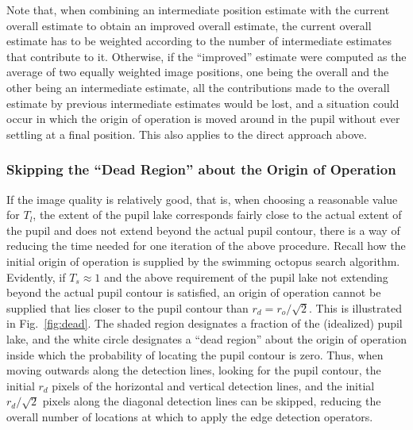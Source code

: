 Note that, when combining an intermediate position estimate with the
current overall estimate to obtain an improved overall estimate, the
current overall estimate has to be weighted according to the number of
intermediate estimates that contribute to it.  Otherwise, if the
``improved'' estimate were computed as the average of two equally
weighted image positions, one being the overall and the other being an
intermediate estimate, all the contributions made to the overall
estimate by previous intermediate estimates would be lost, and a
situation could occur in which the origin of operation is moved around
in the pupil without ever settling at a final position.  This also
applies to the direct approach above.

\subsubsection{Skipping the ``Dead Region'' about the Origin of
  Operation}

If the image quality is relatively good, that is, when choosing a
reasonable value for $T_{l}$, the extent of the pupil lake corresponds
fairly close to the actual extent of the pupil and does not extend
beyond the actual pupil contour, there is a way of reducing the time
needed for one iteration of the above procedure.  Recall how the
initial origin of operation is supplied by the swimming octopus search
algorithm.  Evidently, if $T_{s}\approx 1$ and the above requirement
of the pupil lake not extending beyond the actual pupil contour is
satisfied, an origin of operation cannot be supplied that lies closer
to the pupil contour than $r_{d}=r_{o}/\sqrt{2}$.  This is illustrated
in Fig.~\ref{fig:dead}.  The shaded region designates a fraction of
the (idealized) pupil lake, and the white circle designates a ``dead
region'' about the origin of operation inside which the probability of
locating the pupil contour is zero.  Thus, when moving outwards along
the detection lines, looking for the pupil contour, the initial
$r_{d}$ pixels of the horizontal and vertical detection lines, and the
initial $r_{d}/\sqrt{2}$ pixels along the diagonal detection lines can
be skipped, reducing the overall number of locations at which to apply
the edge detection operators.

